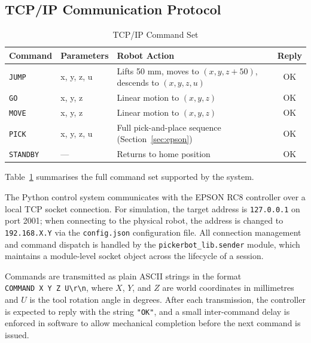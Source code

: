 \documentclass[conference]{IEEEtran}
\begin{document}
\subsection{TCP/IP Communication Protocol}

\begin{table}[t]
  \caption{TCP/IP Command Set}
  \label{tab:commands}
  \centering
  \begin{tabular}{@{}llp{4.2cm}c@{}}
    \toprule
    \textbf{Command} & \textbf{Parameters} & \textbf{Robot Action} & \textbf{Reply} \\
    \midrule
    \texttt{JUMP}    & x, y, z, u & Lifts 50 mm, moves to $(x, y, z{+}50)$, descends to $(x, y, z, u)$ & OK \\
    \texttt{GO}      & x, y, z    & Linear motion to $(x, y, z)$                                      & OK \\
    \texttt{MOVE}    & x, y, z    & Linear motion to $(x, y, z)$                                      & OK \\
    \texttt{PICK}    & x, y, z, u & Full pick-and-place sequence (Section~\ref{sec:epson})             & OK \\
    \texttt{STANDBY} & ---        & Returns to home position                                           & OK \\
    \bottomrule
  \end{tabular}
\end{table}

Table~\ref{tab:commands} summarises the full command set supported by the system.

The Python control system communicates with the EPSON RC8 controller over a local TCP socket connection. For simulation, the target address is \texttt{127.0.0.1} on port 2001; when connecting to the physical robot, the address is changed to \texttt{192.168.X.Y} via the \texttt{config.json} configuration file. All connection management and command dispatch is handled by the \texttt{pickerbot\_lib.sender} module, which maintains a module-level socket object across the lifecycle of a session.

Commands are transmitted as plain ASCII strings in the format \texttt{COMMAND~X~Y~Z~U\textbackslash r\textbackslash n}, where $X$, $Y$, and $Z$ are world coordinates in millimetres and $U$ is the tool rotation angle in degrees. After each transmission, the controller is expected to reply with the string \texttt{"OK"}, and a small inter-command delay is enforced in software to allow mechanical completion before the next command is issued. 
\end{document}
